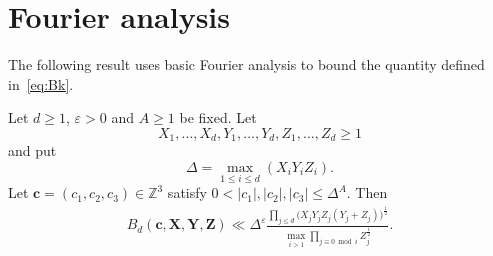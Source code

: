 \section{Fourier analysis}\label{s:fourier}

The following result uses basic Fourier analysis to bound the
quantity
defined in~\eqref{eq:Bk}.

\begin{proposition}\label{prop:FourierAnalysis}
Let $d\geq 1$, $\varepsilon>0$ and $A\geq 1$ be fixed.
Let \[
X_1,\ldots, X_d, Y_1,\ldots, Y_d,Z_1,\ldots, Z_d\geq 1
\]
and put
\begin{equation}\label{eq:Delta}
\Delta =\max_{1\leq i\leq d}(X_i Y_i Z_i).
\end{equation}
Let $\mathbf{c}=(c_1,c_2,c_3)\in \mathbb{Z}^3$ satisfy $0<|c_1|,|c_2|,|c_3|\leq \Delta^A$.
Then
\begin{align*}
B_d(\mathbf{c},\mathbf{X},\mathbf{Y},\mathbf{Z}) \ll
\Delta^\varepsilon \frac{\prod_{j\leq d} \big(X_j Y_j Z_j(Y_j+Z_j)\big)^{\frac{1}{2}}}{\max_{i>1}\prod_{j\equiv 0\bmod i}Z_j^{\frac{1}{2}}}.
\end{align*}
\end{proposition}

